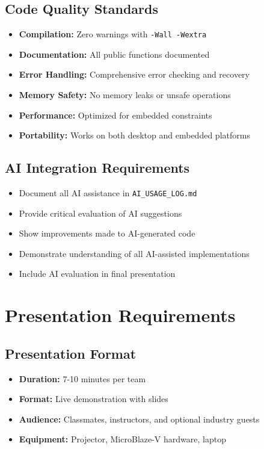 \documentclass[11pt,a4paper]{article}
\begin{document}
\subsection{Code Quality Standards}
\begin{itemize}
    \item \textbf{Compilation:} Zero warnings with \texttt{-Wall -Wextra}
    \item \textbf{Documentation:} All public functions documented
    \item \textbf{Error Handling:} Comprehensive error checking and recovery
    \item \textbf{Memory Safety:} No memory leaks or unsafe operations
    \item \textbf{Performance:} Optimized for embedded constraints
    \item \textbf{Portability:} Works on both desktop and embedded platforms
\end{itemize}

\subsection{AI Integration Requirements}
\begin{itemize}
    \item Document all AI assistance in \texttt{AI\_USAGE\_LOG.md}
    \item Provide critical evaluation of AI suggestions
    \item Show improvements made to AI-generated code
    \item Demonstrate understanding of all AI-assisted implementations
    \item Include AI evaluation in final presentation
\end{itemize}

\section{Presentation Requirements}

\subsection{Presentation Format}
\begin{itemize}
    \item \textbf{Duration:} 7-10 minutes per team
    \item \textbf{Format:} Live demonstration with slides
    \item \textbf{Audience:} Classmates, instructors, and optional industry guests
    \item \textbf{Equipment:} Projector, MicroBlaze-V hardware, laptop
\end{itemize}
\end{document}
